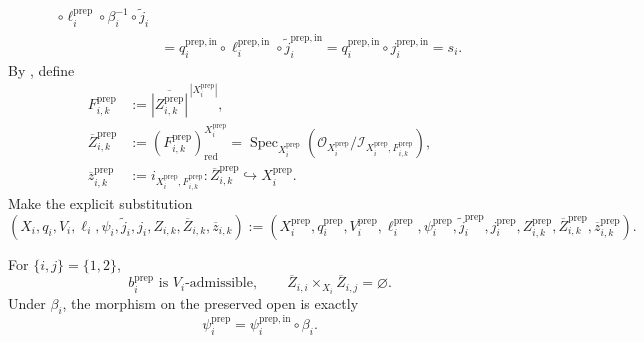 \begin{definition}
\[\begin{aligned}
          \circ\ell_i^{\mathrm{prep}}
          \circ\beta_i^{-1}\circ\widetilde j_i\\
      &=q_i^{\mathrm{prep,in}}\circ\ell_i^{\mathrm{prep,in}}
          \circ\widetilde j_i^{\mathrm{prep,in}}
       =q_i^{\mathrm{prep,in}}\circ j_i^{\mathrm{prep,in}}
       =s_i.
  \end{aligned}
  \]
  By , define
  \[
  \begin{aligned}
    F_{i,k}^{\mathrm{prep}}
      &:=\overline{|Z_{i,k}^{\mathrm{prep}}|}^{\,|X_i^{\mathrm{prep}}|},\\
    \overline Z_{i,k}^{\mathrm{prep}}
      &:=(F_{i,k}^{\mathrm{prep}})_{\mathrm{red}}^{X_i^{\mathrm{prep}}}
        =\operatorname{Spec}_{X_i^{\mathrm{prep}}}
          \!\left(\mathcal O_{X_i^{\mathrm{prep}}}/
            \mathcal I_{X_i^{\mathrm{prep}},F_{i,k}^{\mathrm{prep}}}\right),\\
    \overline z_{i,k}^{\mathrm{prep}}
      &:=i_{X_i^{\mathrm{prep}},F_{i,k}^{\mathrm{prep}}}
        \colon\overline Z_{i,k}^{\mathrm{prep}}
          \hookrightarrow X_i^{\mathrm{prep}}.
  \end{aligned}
  \]
  Make the explicit substitution
  \[
    (X_i,q_i,V_i,\ell_i,\psi_i,\widetilde j_i,j_i,
      Z_{i,k},\overline Z_{i,k},\overline z_{i,k})
      :=
    (X_i^{\mathrm{prep}},q_i^{\mathrm{prep}},
      V_i^{\mathrm{prep}},\ell_i^{\mathrm{prep}},
      \psi_i^{\mathrm{prep}},\widetilde j_i^{\mathrm{prep}},
      j_i^{\mathrm{prep}},
      Z_{i,k}^{\mathrm{prep}},\overline Z_{i,k}^{\mathrm{prep}},
      \overline z_{i,k}^{\mathrm{prep}}).
  \]
\end{definition}

\begin{lemma}
  \label{lemma:nagata-prepared-boundaries}
  \lean{}

  For $\{i,j\}=\{1,2\}$,
  \[
    b_i^{\mathrm{prep}}\text{ is }V_i\text{-admissible},\qquad
    \overline Z_{i,i}\times_{X_i}\overline Z_{i,j}=\varnothing.
  \]
  Under $\beta_i$, the morphism on the preserved open is exactly
  \[
    \psi_i^{\mathrm{prep}}
      =\psi_i^{\mathrm{prep,in}}\circ\beta_i.
  \]
\end{lemma}

